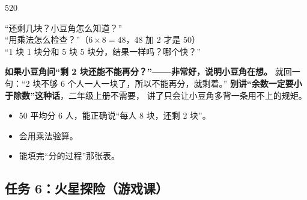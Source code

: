 \begin{lesson}{5}{20}
\begin{saybox}
“还剩几块？小豆角怎么知道？”\\
“用乘法怎么检查？”（$6\times8=48$，48 加 2 才是 50）\\
“1 块 1 块分和 5 块 5 块分，结果一样吗？哪个快？”
\end{saybox}

\begin{pitbox}
\textbf{如果小豆角问“剩 2 块还能不能再分？”——非常好，说明小豆角在想。}
就回一句：“2 块不够 6 个人一人一块了，所以不能再分，就剩着。”
\textbf{别讲“余数一定要小于除数”这种话}，二年级上册不需要，
讲了只会让小豆角多背一条用不上的规矩。
\end{pitbox}

\begin{passbox}
\begin{itemize}
  \item 50 平均分 6 人，能正确说“每人 8 块，还剩 2 块”。
  \item 会用乘法验算。
  \item 能填完“分的过程”那张表。
\end{itemize}
\end{passbox}
\end{lesson}

\subsection{任务 6：火星探险（游戏课）}

